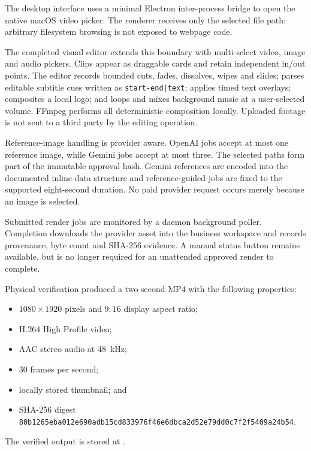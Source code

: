 The desktop interface uses a minimal Electron inter-process bridge to open the
native macOS video picker. The renderer receives only the selected file path;
arbitrary filesystem browsing is not exposed to webpage code.

The completed visual editor extends this boundary with multi-select video,
image and audio pickers. Clips appear as draggable cards and retain independent
in/out points. The editor records bounded cuts, fades, dissolves, wipes and
slides; parses editable subtitle cues written as
\texttt{start-end|text}; applies timed text overlays; composites a local logo;
and loops and mixes background music at a user-selected volume. FFmpeg performs
all deterministic composition locally. Uploaded footage is not sent to a third
party by the editing operation.

Reference-image handling is provider aware. OpenAI jobs accept at most one
reference image, while Gemini jobs accept at most three. The selected paths form
part of the immutable approval hash. Gemini references are encoded into the
documented inline-data structure and reference-guided jobs are fixed to the
supported eight-second duration. No paid provider request occurs merely because
an image is selected.

Submitted render jobs are monitored by a daemon background poller. Completion
downloads the provider asset into the business workspace and records provenance,
byte count and SHA-256 evidence. A manual status button remains available, but
is no longer required for an unattended approved render to complete.

Physical verification produced a two-second MP4 with the following properties:

\begin{itemize}
    \item $1080\times1920$ pixels and $9{:}16$ display aspect ratio;
    \item H.264 High Profile video;
    \item AAC stereo audio at 48~kHz;
    \item 30 frames per second;
    \item locally stored thumbnail; and
    \item SHA-256 digest
    \texttt{80b1265eba012e690adb15cd833976f46e6dbca2d52e79dd0c7f2f5409a24b54}.
\end{itemize}

The verified output is stored at
.

